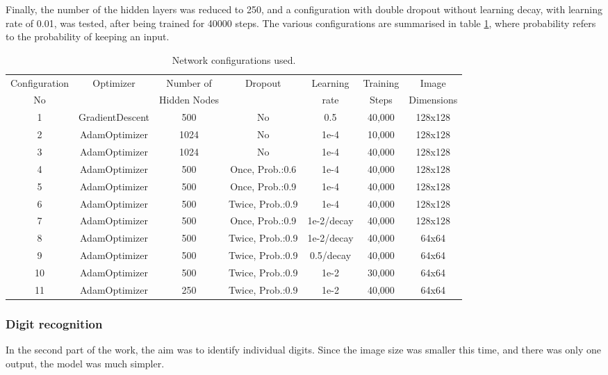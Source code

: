 \documentclass[final,12p,times]{elsarticle}
\begin{document}
\begin{Itemize}
Finally, the number of the hidden layers was reduced to 250, and a configuration with double dropout without learning decay, 
with learning rate of 0.01, was tested, after being trained for 40000 steps.
The various configurations are summarised in table \ref{tab:Table 4.1}, where probability refers to the probability of keeping an input.

\begin{table}[H]
\caption{Network configurations used.}
\centering
\begin{tabular}{ c  c  c  c  c  c  c }
\hline
Configuration& Optimizer &Number of     & Dropout & Learning  & Training & Image\\
      No     &           &Hidden Nodes  &         & rate      & Steps    & Dimensions\\
		 
\hline
1&GradientDescent&500&No&0.5&40,000&128x128\\
2&AdamOptimizer&1024&No&1e-4&10,000&128x128\\
3&AdamOptimizer&1024&No&1e-4&40,000&128x128\\
4&AdamOptimizer&500&Once, Prob.:0.6&1e-4&40,000&128x128\\
5&AdamOptimizer&500&Once, Prob.:0.9&1e-4&40,000&128x128\\
6&AdamOptimizer&500&Twice, Prob.:0.9&1e-4&40,000&128x128\\
7&AdamOptimizer&500&Once, Prob.:0.9&1e-2/decay&40,000&128x128\\
8&AdamOptimizer&500&Twice, Prob.:0.9&1e-2/decay&40,000&64x64\\
9&AdamOptimizer&500&Twice, Prob.:0.9&0.5/decay&40,000&64x64\\
10&AdamOptimizer&500&Twice, Prob.:0.9&1e-2&30,000&64x64\\
11&AdamOptimizer&250&Twice, Prob.:0.9&1e-2&40,000&64x64\\
\hline
\end{tabular}
\label{tab:Table 4.1}
\end{table}

\subsubsection{Digit recognition}
\label{sec:4.2.2}
In the second part of the work, the aim was to identify individual digits.
Since the image size was smaller this time, and there was only one output, the model was much simpler.


\end{Itemize}
\end{document}
